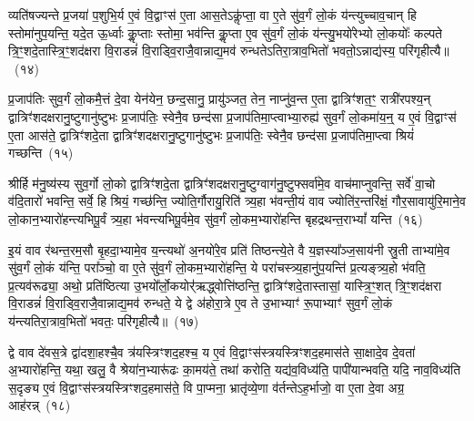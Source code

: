 व्यति॑षज्यन्ते प्र॒जया॑ प॒शुभि॒र्य ए॒वं वि॒द्वाꣳस॑ ए॒ता आस॒ते\-ऽकॢ॑प्ता॒ वा ए॒ते सु॑व॒र्गं लो॒कं य॑न्त्युच्चाव॒चान् हि स्तोमा॑नुप॒यन्ति॒ यदे॒त ऊ॒र्ध्वाः कॢ॒प्ताः स्तोमा॒ भव॑न्ति कॢ॒प्ता ए॒व सु॑व॒र्गं लो॒कं य॑न्त्यु॒भयो॑रेभ्यो लो॒कयोः᳚ कल्पते त्रि॒ꣳ॒शदे॒तास्त्रि॒ꣳ॒शद॑क्षरा वि॒राडन्नं॑ वि॒राड्वि॒राजै॒वान्नाद्य॒मव॑ रुन्धते\-ऽतिरा॒त्राव॒भितो॑ भवतो॒\-ऽन्नाद्य॑स्य॒ परि॑गृहीत्यै॥~(१४)\ip

{\anuvakamend[{ओष॑धीः संवथ्स॒र ए॒वाव॑ प्रति॒ष्ठाय॒ व्यति॑ष॒क्तैका॒न्नप॑ञ्चा॒शच्च॑}]}

प्र॒जा\-प॑तिः सुव॒र्गं लो॒कमै॒त्तं दे॒वा येन॑येन॒ छन्द॒सानु॒ प्रायु॑ञ्जत॒ तेन॒ नाप्नु॑व॒न्त ए॒ता द्वात्रिꣳ॑शत॒ꣳ॒ रात्री॑रपश्य॒न् द्वात्रिꣳ॑शदक्षरानु॒ष्टुगानु॑ष्टुभः प्र॒जा\-प॑तिः॒ स्वेनै॒व छन्द॑सा प्र॒जा\-प॑तिमा॒प्त्वाभ्या॒रुह्य॑ सुव॒र्गं लो॒कमा॑य॒न्॒ य ए॒वं वि॒द्वाꣳस॑ ए॒ता आस॑ते॒ द्वात्रिꣳ॑शदे॒ता द्वात्रिꣳ॑शदक्षरानु॒ष्टुगानु॑ष्टुभः प्र॒जा\-प॑तिः॒ स्वेनै॒व छन्द॑सा प्र॒जा\-प॑तिमा॒प्त्वा श्रियं॑ गच्छन्ति~(१५)\ip

श्रीर्\mbox{}हि म॑नु॒ष्य॑स्य सुव॒र्गो लो॒को द्वात्रिꣳ॑शदे॒ता द्वात्रिꣳ॑शदक्षरानु॒ष्टुग्वाग॑नु॒ष्टुफ्सर्वा॑मे॒व वाच॑माप्नुवन्ति॒ सर्वे॑ वा॒चो व॑दि॒तारो॑ भवन्ति॒ सर्वे॒ हि श्रियं॒ गच्छ॑न्ति॒ ज्योति॒र्गौरायु॒रिति॑ त्र्य॒हा भ॑वन्ती॒यं वाव ज्योति॑र॒न्तरि॑क्षं॒ गौर॒सावायु॑\-रि॒माने॒व लो॒कान॒भ्यारो॑हन्त्यभिपू॒र्वं त्र्य॒हा भ॑वन्त्यभिपू॒र्वमे॒व सु॑व॒र्गं लो॒कम॒भ्यारो॑हन्ति बृहद्रथन्त॒रा\-भ्यां᳚ यन्ति~(१६)\ip

इ॒यं वाव र॑थन्त॒रम॒सौ बृ॒हदा॒भ्यामे॒व य॒न्त्यथो॑ अ॒नयो॑रे॒व प्रति॑ तिष्ठन्त्ये॒ते वै य॒ज्ञस्या᳚ञ्ज॒साय॑नी स्रु॒ती ताभ्या॑मे॒व सु॑व॒र्गं लो॒कं य॑न्ति॒ परा᳚ञ्चो॒ वा ए॒ते सु॑व॒र्गं लो॒कम॒भ्यारो॑हन्ति॒ ये परा॑चस्त्र्य॒हानु॑प॒यन्ति॑ प्र॒त्यङ्त्र्य॒हो भ॑वति॒ प्र॒त्यव॑रूढ्या॒ अथो॒ प्रति॑ष्ठित्या उ॒भयो᳚र्लो॒कयोर्॑\mbox{}॑ऋद्ध्वोत्ति॑ष्ठन्ति॒ द्वात्रिꣳ॑शदे॒तास्तासां॒ यास्त्रि॒ꣳ॒शत् त्रि॒ꣳ॒शद॑क्षरा वि॒राडन्नं॑ वि॒राड्वि॒राजै॒वान्नाद्य॒मव॑ रुन्धते॒ ये द्वे अ॑होरा॒त्रे ए॒व ते उ॒भाभ्याꣳ॑ रू॒पाभ्याꣳ॑ सुव॒र्गं लो॒कं य॑न्त्यतिरा॒त्राव॒भितो॑ भवतः॒ परि॑गृहीत्यै॥~(१७)\ip

{\anuvakamend[{ग॒च्छ॒न्ति॒ य॒न्ति॒ त्रि॒ꣳ॒शद॑क्षरा॒ द्वाविꣳ॑शतिश्च}]}

द्वे वाव दे॑वस॒त्रे द्वा॑दशा॒हश्चै॒व त्र॑यस्त्रिꣳशद॒हश्च॒ य ए॒वं वि॒द्वाꣳस॑स्त्रयस्त्रिꣳशद॒हमास॑ते सा॒क्षादे॒व दे॒वता॑ अ॒भ्यारो॑हन्ति॒ यथा॒ खलु॒ वै श्रेया॑न॒भ्यारू॑ढः का॒मय॑ते॒ तथा॑ करोति॒ यद्य॑व॒विध्य॑ति॒ पापी॑यान्भवति॒ यदि॒ नाव॒विध्य॑ति स॒दृङ्य ए॒वं वि॒द्वाꣳस॑स्त्रयस्त्रिꣳशद॒हमास॑ते॒ वि पा॒प्मना॒ भ्रातृ॑व्ये॒णा व॑र्तन्ते\-ऽह॒र्भाजो॒ वा ए॒ता दे॒वा अग्र॒ आह॑रन्न्~(१८)\ip

